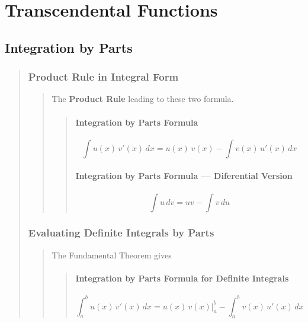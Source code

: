 \documentclass{report}
\begin{document}

\chapter{Transcendental  Functions}
\setcounter{section}{1}


\section{Integration by Parts}
\begin{quote}

	\subsection{Product Rule in Integral Form}
	\begin{quote}
		The \textbf{Product Rule} leading to these two formula.

		\begin{quote}
			\subsubsection{Integration by Parts Formula}
			$$\int u(x)\, v'(x) \,dx =u(x)\,v(x)-\int v(x)\,u'(x)\,dx$$

			\subsubsection{Integration by Parts Formula — Diferential Version}
			$$\int u\,{dv} = uv - \int v\,{du}$$

		\end{quote}

	\end{quote}

	\subsection{Evaluating Definite Integrals by Parts	}
	\begin{quote}

		The Fundamental Theorem gives 
		
		\begin{quote}
		\subsubsection{Integration by Parts Formula for Deﬁnite Integrals }
		$$\int_{a}^{b}u(x)\,v'(x)\,dx = u(x)\,v(x) \bigg |_{a}^{b} - \int_{a}^{b}v(x)\, u'(x)\, dx $$
		\end{quote}

	\end{quote}
\end{quote}
\end{document}
